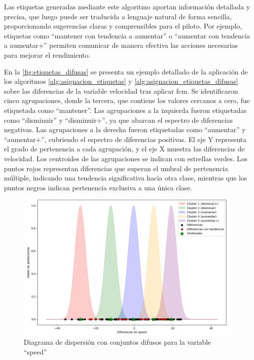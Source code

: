 Las etiquetas generadas mediante este algoritmo aportan información detallada y precisa, que luego puede ser traducida a lenguaje natural de forma sencilla, proporcionando sugerencias claras y comprensibles para el piloto. Por ejemplo, etiquetas como ``mantener con tendencia a aumentar'' o ``aumentar con tendencia a aumentar+'' permiten comunicar de manera efectiva las acciones necesarias para mejorar el rendimiento.


En la \autoref{fig:etiquetas_difusas} se presenta un ejemplo detallado de la aplicación de los algoritmos \autoref{alg:asignacion_etiquetas} y \autoref{alg:asignacion_etiquetas_difusas} sobre las diferencias de la variable velocidad tras aplicar \ac{fcm}. Se identificaron cinco agrupaciones, donde la tercera, que contiene los valores cercanos a cero, fue etiquetada como ``mantener''. Las agrupaciones a la izquierda fueron etiquetadas como ``disminuir'' y ``disminuir+'', ya que abarcan el espectro de diferencias negativas. Las agrupaciones a la derecha fueron etiquetadas como ``aumentar'' y ``aumentar+'', cubriendo el espectro de diferencias positivas. El eje Y representa el grado de pertenencia a cada agrupación, y el eje X muestra las diferencias de velocidad. Los centroides de las agrupaciones se indican con estrellas verdes. Los puntos rojos representan diferencias que superan el umbral de pertenencia múltiple, indicando una tendencia significativa hacia otra clase, mientras que los puntos negros indican pertenencia exclusiva a una única clase.


\begin{figure}[H]
	\centering
	\includegraphics[width=1\linewidth]{./figs/herramientas/desarrollo/etiquetas_difusas.png}
	\caption[Diagrama de dispersión con conjuntos difusos para la variable ``speed'']{Diagrama de dispersión con conjuntos difusos para la variable ``speed''}
    \label{fig:etiquetas_difusas}
\end{figure}


